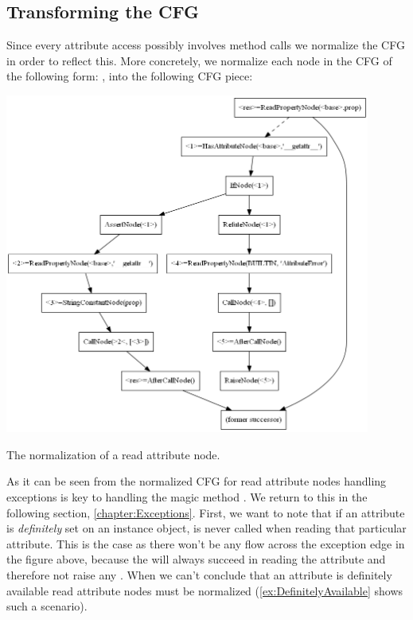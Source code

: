 \subsection{Transforming the CFG}
\label{Magic methods transformation}
Since every attribute access possibly involves method calls we normalize the CFG in order to reflect this. More concretely, we normalize each node in the CFG of the following form: , into the following CFG piece:

\begin{listing}[H]
  \begin{center}
    \includegraphics[width=0.9\textwidth]{images/readproperty.png}
  \end{center}
  \vspace{-10pt}
  \caption{The normalization of a read attribute node.}
  \label{fig:MagicMethods1}
\end{listing}

As it can be seen from the normalized CFG for read attribute nodes handling exceptions is key to handling the magic method . We return to this in the following section, \autoref{chapter:Exceptions}. First, we want to note that if an attribute is \textit{definitely} set on an instance object,  is never called when reading that particular attribute. This is the case as there won't be any flow across the exception edge in the figure above, because the  will always succeed in reading the attribute and therefore not raise any . When we can't conclude that an attribute is definitely available read attribute nodes must be normalized (\autoref{ex:DefinitelyAvailable} shows such a scenario).

